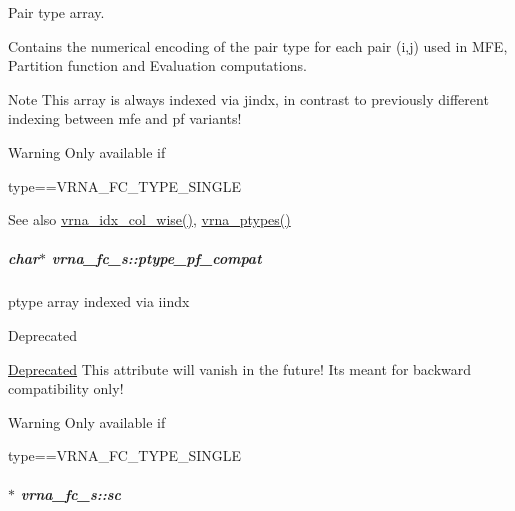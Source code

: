 Pair type array. 

Contains the numerical encoding of the pair type for each pair (i,j) used in M\+FE, Partition function and Evaluation computations. \begin{DoxyNote}{Note}
This array is always indexed via jindx, in contrast to previously different indexing between mfe and pf variants! 
\end{DoxyNote}
\begin{DoxyWarning}{Warning}
Only available if\begin{DoxyVerb}type==VRNA_FC_TYPE_SINGLE \end{DoxyVerb}
 
\end{DoxyWarning}
\begin{DoxySeeAlso}{See also}
\hyperlink{group__utils_ga89ebc69c52fa0c78c9e1974b0017746b}{vrna\+\_\+idx\+\_\+col\+\_\+wise()}, \hyperlink{group__utils_ga51a9e86a5f731f5f2f5584ee67cee4a8}{vrna\+\_\+ptypes()} 
\end{DoxySeeAlso}
\subparagraph[{\texorpdfstring{ptype\+\_\+pf\+\_\+compat}{ptype_pf_compat}}]{\setlength{\rightskip}{0pt plus 5cm}char$\ast$ vrna\+\_\+fc\+\_\+s\+::ptype\+\_\+pf\+\_\+compat}\hypertarget{group__fold__compound_a7fe1235ce3d41287695f1ae1e283e8fc}{}\label{group__fold__compound_a7fe1235ce3d41287695f1ae1e283e8fc}


ptype array indexed via iindx 

\begin{DoxyRefDesc}{Deprecated}
\item[\hyperlink{deprecated__deprecated000051}{Deprecated}]This attribute will vanish in the future! It\textquotesingle{}s meant for backward compatibility only! \end{DoxyRefDesc}
\begin{DoxyWarning}{Warning}
Only available if\begin{DoxyVerb}type==VRNA_FC_TYPE_SINGLE \end{DoxyVerb}
 
\end{DoxyWarning}
\subparagraph[{\texorpdfstring{sc}{sc}}]{$\ast$ vrna\+\_\+fc\+\_\+s\+::sc}\hypertarget{group__fold__compound_ac7089e90460ad3990a308808c8044c9f}{}\label{group__fold__compound_ac7089e90460ad3990a308808c8044c9f}


